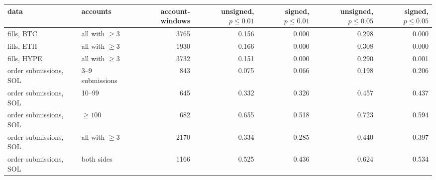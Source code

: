 \begin{tabular}{llrrrrr}
\toprule
data & accounts & account-windows & unsigned, $p\le0.01$ & signed, $p\le0.01$ & unsigned, $p\le0.05$ & signed, $p\le0.05$ \\
\midrule
fills, BTC & all with $\ge3$ & 3765 & 0.156 & 0.000 & 0.298 & 0.000 \\
fills, ETH & all with $\ge3$ & 1930 & 0.166 & 0.000 & 0.308 & 0.000 \\
fills, HYPE & all with $\ge3$ & 3732 & 0.151 & 0.000 & 0.290 & 0.001 \\
order submissions, SOL & 3--9 submissions & 843 & 0.075 & 0.066 & 0.198 & 0.206 \\
order submissions, SOL & 10--99 & 645 & 0.332 & 0.326 & 0.457 & 0.437 \\
order submissions, SOL & $\ge100$ & 682 & 0.655 & 0.518 & 0.723 & 0.594 \\
order submissions, SOL & all with $\ge3$ & 2170 & 0.334 & 0.285 & 0.440 & 0.397 \\
order submissions, SOL & both sides & 1166 & 0.525 & 0.436 & 0.624 & 0.534 \\
\bottomrule
\end{tabular}

